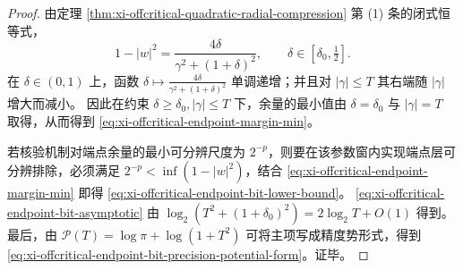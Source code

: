 \begin{proof}
由定理 \ref{thm:xi-offcritical-quadratic-radial-compression} 第 (1) 条的闭式恒等式，
\[
1-|w|^2=\frac{4\delta}{\gamma^2+(1+\delta)^2},
\qquad \delta\in[\delta_0,\tfrac12].
\]
在 \(\delta\in(0,1)\) 上，函数 \(\delta\mapsto \frac{4\delta}{\gamma^2+(1+\delta)^2}\) 单调递增；并且对 \(|\gamma|\le T\) 其右端随 \(|\gamma|\) 增大而减小。
因此在约束 \(\delta\ge\delta_0,|\gamma|\le T\) 下，余量的最小值由 \(\delta=\delta_0\) 与 \(|\gamma|=T\) 取得，从而得到 \eqref{eq:xi-offcritical-endpoint-margin-min}。
\par
若核验机制对端点余量的最小可分辨尺度为 \(2^{-p}\)，则要在该参数窗内实现端点层可分辨排除，必须满足 \(2^{-p}<\inf(1-|w|^2)\)，结合 \eqref{eq:xi-offcritical-endpoint-margin-min} 即得 \eqref{eq:xi-offcritical-endpoint-bit-lower-bound}。
\eqref{eq:xi-offcritical-endpoint-bit-asymptotic} 由 \(\log_2(T^2+(1+\delta_0)^2)=2\log_2 T+O(1)\) 得到。
最后，由 \(\mathcal{P}(T)=\log\pi+\log(1+T^2)\) 可将主项写成精度势形式，得到 \eqref{eq:xi-offcritical-endpoint-bit-precision-potential-form}。证毕。
\end{proof}

\endinput
